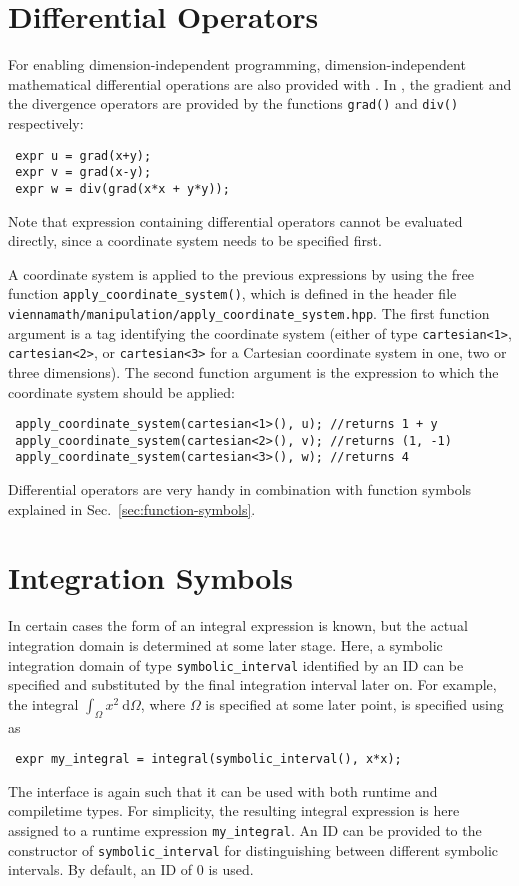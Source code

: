   \section{Differential Operators}
For enabling dimension-independent programming, dimension-independent mathematical differential operations are also provided with {\ViennaMath}.
In {\ViennaMathversion}, the gradient and the divergence operators are provided by the functions \lstinline|grad()| and \lstinline|div()| respectively:
\begin{lstlisting}
 expr u = grad(x+y);
 expr v = grad(x-y);
 expr w = div(grad(x*x + y*y));
\end{lstlisting}
Note that expression containing differential operators cannot be evaluated directly, since a coordinate system needs to be specified first.

A coordinate system is applied to the previous expressions by using the free function \lstinline|apply_coordinate_system()|, which is defined in the header file \lstinline|viennamath/manipulation/apply_coordinate_system.hpp|. The first function argument is a tag identifying the coordinate system (either of type \lstinline|cartesian<1>|, \lstinline|cartesian<2>|, or \lstinline|cartesian<3>| for a Cartesian coordinate system in one, two or three dimensions). The second function argument is the expression to which the coordinate system should be applied:
\begin{lstlisting}
 apply_coordinate_system(cartesian<1>(), u); //returns 1 + y
 apply_coordinate_system(cartesian<2>(), v); //returns (1, -1)
 apply_coordinate_system(cartesian<3>(), w); //returns 4
\end{lstlisting}
Differential operators are very handy in combination with function symbols explained in Sec.~\ref{sec:function-symbols}.

  \section{Integration Symbols}
In certain cases the form of an integral expression is known, but the actual integration domain is determined at some later stage. 
Here, a symbolic integration domain of type \lstinline|symbolic_interval| identified by an ID can be specified and substituted by the final integration interval later on.
For example, the integral $\int_\Omega x^2 \: \mathrm{d} \Omega$, where $\Omega$ is specified at some later point, is specified using {\ViennaMath} as
\begin{lstlisting}
 expr my_integral = integral(symbolic_interval(), x*x);
\end{lstlisting}
The interface is again such that it can be used with both runtime and compiletime types. For simplicity, the resulting integral expression is here assigned to a runtime expression \lstinline|my_integral|. An ID can be provided to the constructor of \lstinline|symbolic_interval| for distinguishing between different symbolic intervals. By default, an ID of $0$ is used.

